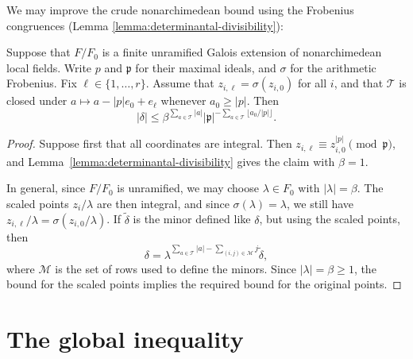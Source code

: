 \documentclass[reqno]{amsart} 
\begin{document}
We may improve the crude nonarchimedean bound using the Frobenius congruences (Lemma \ref{lemma:determinantal-divisibility}):
\begin{lemma}\label{lemma:cus6m7ho5n}
  Suppose that $F/F_0$ is a finite unramified Galois extension of nonarchimedean local fields.  Write $p$ and $\mathfrak{p}$ for their maximal ideals, and $\sigma$ for the arithmetic Frobenius.  Fix $\ell\in\{1,\dotsc,r\}$.  Assume that $z_{i,\ell}=\sigma(z_{i,0})$ for all $i$, and that $\mathcal{T}$ is closed under $a\mapsto a-|p|e_0+e_\ell$ whenever $a_0\geq|p|$.  Then
  \begin{equation*}
    |\delta|
    \leq \beta^{\sum_{a\in\mathcal{T}}|a|}
    |\mathfrak{p}|^{-\sum_{a\in\mathcal{T}}\lfloor a_0/|p|\rfloor}.
  \end{equation*}
\end{lemma}
\begin{proof}
  Suppose first that all coordinates are integral.  Then $z_{i,\ell}\equiv z_{i,0}^{|p|}\pmod{\mathfrak{p}}$, and Lemma~\ref{lemma:determinantal-divisibility} gives the claim with $\beta=1$.

  In general, since $F / F_0$ is unramified, we may choose $\lambda \in F_0$ with $|\lambda| = \beta$.  The scaled points $z_i / \lambda$ are then integral, and since $\sigma(\lambda) = \lambda$, we still have $z_{i,\ell}/\lambda = \sigma(z_{i,0}/\lambda)$.  If $\widetilde\delta$ is the minor defined like $\delta$, but using the scaled points, then
  \begin{equation*}
    \delta=\lambda^{\sum_{a\in\mathcal{T}}|a|-\sum_{(i,j)\in\mathcal{M}}j}\widetilde\delta,
  \end{equation*}
  where $\mathcal{M}$ is the set of rows used to define the minors.  Since $|\lambda| = \beta \geq 1$, the bound for the scaled points implies the required bound for the original points.
\end{proof}

\section{The global inequality}\label{section:global}
\end{document}

